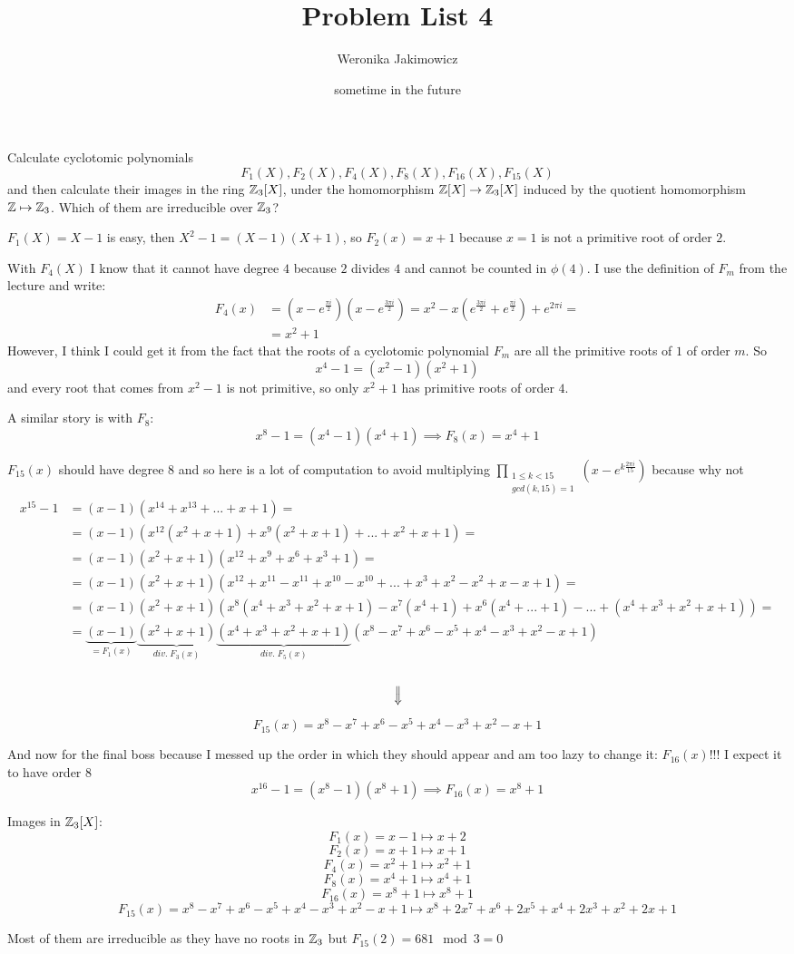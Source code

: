\documentclass{article}
\title{Problem List 4}
\author{Weronika Jakimowicz}
\date{sometime in the future}
\begin{document}
\begin{problem}[1]{}
Calculate cyclotomic polynomials
$$F_1(X),F_2(X),F_4(X),F_8(X),F_{16}(X),F_{15}(X)$$
and then calculate their images in the ring $\mathbb{Z}_3[X]$, under the homomorphism $\mathbb{Z}[X]\to\mathbb{Z}_3[X]$ induced by the quotient homomorphism $\mathbb{Z}\mapsto\mathbb{Z}_3$. Which of them are irreducible over $\mathbb{Z}_3$?
\end{problem}

$F_1(X)=X-1$ is easy, then $X^2-1=(X-1)(X+1)$, so $F_2(x)=x+1$ because $x=1$ is not a primitive root of order $2$. 

With $F_4(X)$ I know that it cannot have degree $4$ because $2$ divides $4$ and cannot be counted in $\phi(4)$. I use the definition of $F_m$ from the lecture and write:
\begin{align*}
    F_4(x)&=(x-e^{\frac{\pi i}{2}})(x-e^{\frac{3\pi i}{2}})=x^2-x(e^{\frac{3\pi i}{2}}+e^{\frac{\pi i}{2}})+e^{2\pi i}=\\
    &=x^2+1
\end{align*}
However, I think I could get it from the fact that the roots of a cyclotomic polynomial $F_m$ are all the primitive roots of $1$ of order $m$. So
$$x^4-1=(x^2-1)(x^2+1)$$
and every root that comes from $x^2-1$ is not primitive, so only $x^2+1$ has primitive roots of order $4$.

A similar story is with $F_8:$
$$x^8-1=(x^4-1)(x^4+1)\implies F_8(x)=x^4+1$$

$F_{15}(x)$ should have degree $8$ and so here is a lot of computation to avoid multiplying $\prod\limits_{\substack{1\leq k<15\\gcd(k,15)=1}}(x-e^{k\frac{2\pi i}{15}})$ because why not
\begin{align*}
    x^{15}-1&=(x-1)(x^{14}+x^{13}+...+x+1)=\\
    &=(x-1)(x^{12}(x^2+x+1)+x^{9}(x^2+x+1)+...+x^2+x+1)=\\
    &=(x-1)(x^2+x+1)(x^{12}+x^9+x^6+x^3+1)=\\
    &=(x-1)(x^2+x+1)(x^{12}+x^{11}-x^{11}+x^{10}-x^{10}+...+x^3+x^2-x^2+x-x+1)=\\
    &=(x-1)(x^2+x+1)(x^8(x^4+x^3+x^2+x+1)-x^7(x^4+1)+x^6(x^4+...+1)-...+(x^4+x^3+x^2+x+1))=\\
    &=\underbrace{(x-1)}_{=F_1(x)}\underbrace{(x^2+x+1)}_{div.\;F_3(x)}\underbrace{(x^4+x^3+x^2+x+1)}_{div.\;F_5(x)}(x^8-x^7+x^6-x^5+x^4-x^3+x^2-x+1)
\end{align*}
$$\rotatebox{-90}{$\implies$}$$
$$F_{15}(x)=x^8-x^7+x^6-x^5+x^4-x^3+x^2-x+1$$

And now for the final boss because I messed up the order in which they should appear and am too lazy to change it: $F_{16}(x)$!!! I expect it to have order 8
$$x^{16}-1=(x^8-1)(x^8+1)\implies F_{16}(x)=x^8+1$$
\medskip

Images in $\mathbb{Z}_3[X]$:
$$F_1(x)=x-1\mapsto x+2$$
$$F_2(x)=x+1\mapsto x+1$$
$$F_4(x)=x^2+1\mapsto x^2+1$$
$$F_8(x)=x^4+1\mapsto x^4+1$$
$$F_{16}(x)=x^8+1\mapsto x^8+1$$
$$F_{15}(x)=x^8-x^7+x^6-x^5+x^4-x^3+x^2-x+1\mapsto x^8+2x^7+x^6+2x^5+x^4+2x^3+x^2+2x+1$$

Most of them are irreducible as they have no roots in $\mathbb{Z}_3$ but $F_{15}(2)=681\mod 3=0$
\end{document}
